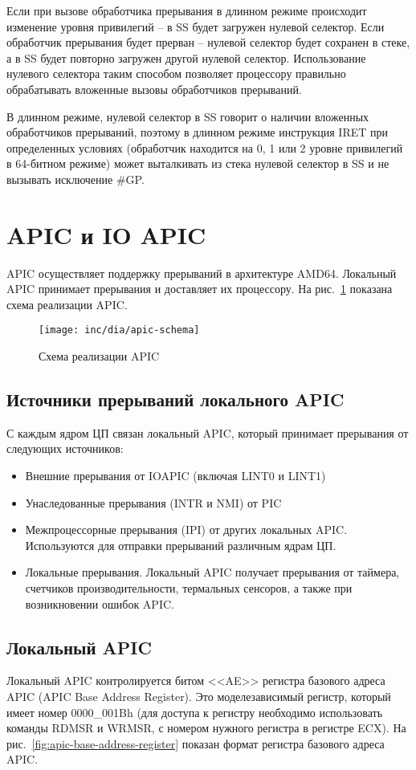 Если при вызове обработчика прерывания в длинном режиме происходит изменение
уровня привилегий -- в SS будет загружен нулевой селектор. Если обработчик
прерывания будет прерван -- нулевой селектор будет сохранен в стеке, а в SS
будет повторно загружен другой нулевой селектор. Использование нулевого
селектора таким способом позволяет процессору правильно обрабатывать вложенные
вызовы обработчиков прерываний.

В длинном режиме, нулевой селектор в SS говорит о наличии вложенных обработчиков прерываний, поэтому
в длинном режиме инструкция IRET при определенных условиях (обработчик находится на 0, 1 или 2 уровне
привилегий в 64-битном режиме)  может выталкивать из стека нулевой селектор в SS и не вызывать исключение \#GP.



\section{APIC и IO APIC}
\label{sec:apic_ioapic}
APIC осуществляет поддержку прерываний в архитектуре AMD64. Локальный APIC принимает прерывания и
доставляет их процессору. На рис.~\ref{fig:apic-schema} показана схема реализации APIC.

\begin{figure}[ht!]
  \centering
  \texttt{[image: inc/dia/apic-schema]}
  \caption{Схема реализации APIC}
  \label{fig:apic-schema}
\end{figure}

\subsection{Источники прерываний локального APIC}
С каждым ядром ЦП связан локальный APIC, который принимает прерывания от следующих источников:
\begin{itemize}
	\item Внешние прерывания от IOAPIC (включая LINT0 и LINT1)
	\item Унаследованные прерывания (INTR и NMI) от PIC
	\item Межпроцессорные прерывания (IPI) от других локальных APIC. Используются
		для отправки прерываний различным ядрам ЦП.
	\item Локальные прерывания. Локальный APIC получает прерывания от таймера,
		счетчиков производительности, термальных сенсоров, а также при возникновении
		ошибок APIC.
\end{itemize}

\subsection{Локальный APIC}
Локальный APIC контролируется битом <<AE>> регистра базового адреса APIC (APIC Base Address Register).
Это моделезависимый регистр, который имеет номер 0000\_001Bh (для доступа к регистру необходимо
использовать команды RDMSR и WRMSR, с номером нужного регистра в регистре ECX).
На рис.~\ref{fig:apic-base-address-register} показан формат регистра базового адреса APIC.

